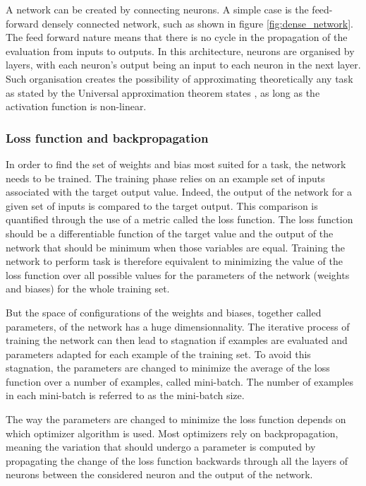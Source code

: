 A network can be created by connecting neurons. A simple case is the feed-forward densely connected network, such as shown in figure \ref{fig:dense_network}. The feed forward nature means that there is no cycle in the propagation of the evaluation from inputs to outputs. In this architecture, neurons are organised by layers, with each neuron's output being an input to each neuron in the next layer. Such organisation creates the possibility of approximating theoretically any task as stated by the Universal approximation theorem states \cite{Cybenko1989}, as long as the activation function is non-linear.

\subsubsection{Loss function and backpropagation}

In order to find the set of weights and bias most suited for a task, the network needs to be trained.
The training phase relies on an example set of inputs associated with the target output value. Indeed, the output of the network for a given set of inputs is compared to the target output. This comparison is quantified through the use of a metric called the loss function. The loss function should be a differentiable function of the target value and the output of the network that should be minimum when those variables are equal. Training the network to perform task is therefore equivalent to minimizing the value of the loss function over all possible values for the parameters of the network (weights and biases) for the whole training set.

But the space of configurations of the weights and biases, together called parameters, of the network has a huge dimensionnality. The iterative process of training the network can then lead to stagnation if examples are evaluated and parameters adapted for each example of the training set. To avoid this stagnation, the parameters are changed to minimize the average of the loss function over a number of examples, called mini-batch. The number of examples in each mini-batch is referred to as the mini-batch size.

The way the parameters are changed to minimize the loss function depends on which optimizer algorithm is used. Most optimizers rely on backpropagation, meaning the variation that should undergo a parameter is computed by propagating the change of the loss function backwards through all the layers of neurons between the considered neuron and the output of the network. 


